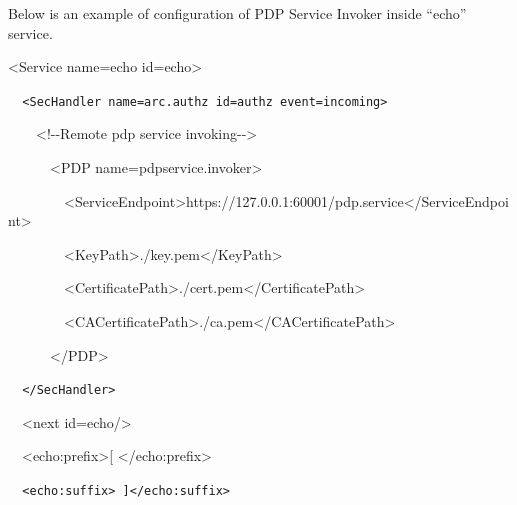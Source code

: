 \documentclass[a4paper]{article}
\begin{document}
{\upshape\color{black}
Below is an example of configuration of PDP Service Invoker inside
{\textquotedblleft}echo{\textquotedblright} service.}

{\ttfamily\color{black}
{\textless}Service name={\textquotedbl}echo{\textquotedbl}
id={\textquotedbl}echo{\textquotedbl}{\textgreater}}

{\upshape\color{black}
\foreignlanguage{spanish}{\texttt{\ \ }}\texttt{{\textless}SecHandler
name={\textquotedbl}arc.authz{\textquotedbl}
id={\textquotedbl}authz{\textquotedbl}
event={\textquotedbl}incoming{\textquotedbl}{\textgreater}}}

{\ttfamily\color{black}
\ \ \ \ {\textless}!-{}-Remote pdp service invoking-{}-{\textgreater}}

{\ttfamily\color{black}
\ \ \ \ \ \ {\textless}PDP
name={\textquotedbl}pdpservice.invoker{\textquotedbl}{\textgreater}}

{\ttfamily\color{black}
\ \ \ \ \ \ \ \ {\textless}ServiceEndpoint{\textgreater}https://127.0.0.1:60001/pdp.service{\textless}/ServiceEndpoint{\textgreater}}

{\ttfamily\color{black}
\ \ \ \ \ \ \ \ {\textless}KeyPath{\textgreater}./key.pem{\textless}/KeyPath{\textgreater}}

{\ttfamily\color{black}
\ \ \ \ \ \ \ \ {\textless}CertificatePath{\textgreater}./cert.pem{\textless}/CertificatePath{\textgreater}}

{\ttfamily\color{black}
\ \ \ \ \ \ \ \ {\textless}CACertificatePath{\textgreater}./ca.pem{\textless}/CACertificatePath{\textgreater}}

{\ttfamily\color{black}
\ \ \ \ \ \ {\textless}/PDP{\textgreater}}

{\upshape\color{black}
\texttt{\ \ }\foreignlanguage{spanish}{\texttt{{\textless}/SecHandler{\textgreater}}}}

{\ttfamily\color{black}
\ \ {\textless}next
id={\textquotedbl}echo{\textquotedbl}/{\textgreater}}

{\ttfamily\color{black}
\ \ {\textless}echo:prefix{\textgreater}[
{\textless}/echo:prefix{\textgreater}}

{\upshape\color{black}
\foreignlanguage{spanish}{\texttt{\ \ }}\texttt{{\textless}echo:suffix{\textgreater}
]{\textless}/echo:suffix{\textgreater}}}
\end{document}
